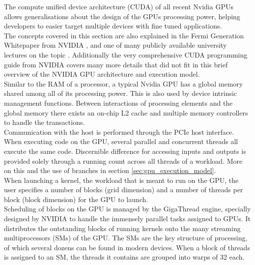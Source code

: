 \documentclass{tudscrreprt}
\begin{document}
				The compute unified device architecture (CUDA) of all recent Nvidia GPUs allows generalisations about the design of the GPUs processing power, helping developers to easier target multiple devices with fine tuned applications. \cite{cuda_smcc} \\
				The concepts covered in this section are also explained in the Fermi Generation Whitepaper from NVIDIA \cite{fermi_whitepaper}, and one of many publicly available university lectures on the topic \cite{gpu_lecture}. Additionally the very comprehensive CUDA programming guide from NVIDIA \cite{cuda_programmingguide} covers many more details that did not fit in this brief overview of the NVIDIA GPU architecture and execution model. \\
				
				Similar to the RAM of a processor, a typical Nvidia GPU has a global memory shared among all of its processing power. This is also used by device intrinsic management functions. Between interactions of processing elements and the global memory there exists an on-chip L2 cache and multiple memory controllers to handle the transactions. \\
				Communication with the host is performed through the PCIe host interface. \\
				
				When executing code on the GPU, several parallel and concurrent threads all execute the same code. Discernible difference for accessing inputs and outputs is provided solely through a running count across all threads of a workload. More on this and the use of branches in section \ref{sec:gpu_execution_model}. \\
				When launching a kernel, the workload that is meant to run on the GPU, the user specifies a number of blocks (grid dimension) and a number of threads per block (block dimension) for the GPU to launch. \\
				Scheduling of blocks on the GPU is managed by the GigaThread engine, specially designed by NVIDIA to handle the immensely parallel tasks assigned to GPUs. It distributes the outstanding blocks of running kernels onto the many streaming multiprocessors (SMs) of the GPU. The SMs are the key structure of processing, of which several dozens can be found in modern devices. When a block of threads is assigned to an SM, the threads it contains are grouped into warps of 32 each. \\
				
\end{document}
